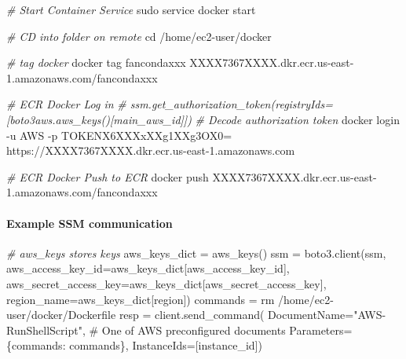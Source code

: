 \documentclass[
]{book}
\newenvironment{Shaded}{\begin{snugshade}}{\end{snugshade}}
\newcommand{\BuiltInTok}[1]{#1}
\newcommand{\CommentTok}[1]{\textcolor[rgb]{0.56,0.35,0.01}{\textit{#1}}}
\newcommand{\ExtensionTok}[1]{#1}
\newcommand{\FunctionTok}[1]{\textcolor[rgb]{0.00,0.00,0.00}{#1}}
\newcommand{\NormalTok}[1]{#1}
\newcommand{\StringTok}[1]{\textcolor[rgb]{0.31,0.60,0.02}{#1}}
\newcommand{\VariableTok}[1]{\textcolor[rgb]{0.00,0.00,0.00}{#1}}
\begin{document}
\begin{Shaded}
\begin{Highlighting}[]
\CommentTok{\# Start Container Service}
\FunctionTok{sudo}\NormalTok{ service docker start}

\CommentTok{\# CD into folder on remote}
\BuiltInTok{cd}\NormalTok{ /home/ec2{-}user/docker}

\CommentTok{\# tag docker}
\ExtensionTok{docker}\NormalTok{ tag fancondaxxx XXXX7367XXXX.dkr.ecr.us{-}east{-}1.amazonaws.com/fancondaxxx}

\CommentTok{\# ECR Docker Log in}
\CommentTok{\# ssm.get\_authorization\_token(registryIds=[boto3aws.aws\_keys()[\textquotesingle{}main\_aws\_id\textquotesingle{}]])}
\CommentTok{\# Decode authorization token}
\ExtensionTok{docker}\NormalTok{ login {-}u AWS {-}p TOKENX6XXXxXXg1XXg3OX0= https://XXXX7367XXXX.dkr.ecr.us{-}east{-}1.amazonaws.com}

\CommentTok{\# ECR Docker Push to ECR}
\ExtensionTok{docker}\NormalTok{ push XXXX7367XXXX.dkr.ecr.us{-}east{-}1.amazonaws.com/fancondaxxx}
\end{Highlighting}
\end{Shaded}

\hypertarget{example-ssm-communication}{%
\paragraph{Example SSM communication}\label{example-ssm-communication}}

\begin{Shaded}
\begin{Highlighting}[]
\CommentTok{\# aws\_keys stores keys}
\ExtensionTok{aws\_keys\_dict}\NormalTok{ = aws\_keys()}
\ExtensionTok{ssm}\NormalTok{ = boto3.client(}\StringTok{\textquotesingle{}ssm\textquotesingle{}}\NormalTok{,}
                   \VariableTok{aws\_access\_key\_id=}\NormalTok{aws\_keys\_dict[}\StringTok{\textquotesingle{}aws\_access\_key\_id\textquotesingle{}}\NormalTok{],}
                   \VariableTok{aws\_secret\_access\_key=}\NormalTok{aws\_keys\_dict[}\StringTok{\textquotesingle{}aws\_secret\_access\_key\textquotesingle{}}\NormalTok{],}
                   \VariableTok{region\_name=}\NormalTok{aws\_keys\_dict[}\StringTok{\textquotesingle{}region\textquotesingle{}}\NormalTok{])}
\ExtensionTok{commands}\NormalTok{ = }\StringTok{\textquotesingle{}rm /home/ec2{-}user/docker/Dockerfile\textquotesingle{}}
\ExtensionTok{resp}\NormalTok{ = client.send\_command(}
        \VariableTok{DocumentName=}\StringTok{"AWS{-}RunShellScript"}\NormalTok{, \# }\ExtensionTok{One}\NormalTok{ of AWS}\StringTok{\textquotesingle{} preconfigured documents}
\StringTok{        Parameters=\{\textquotesingle{}}\NormalTok{commands}\StringTok{\textquotesingle{}: commands\},}
\StringTok{        InstanceIds=[instance\_id])}
\end{Highlighting}
\end{Shaded}
\end{document}
